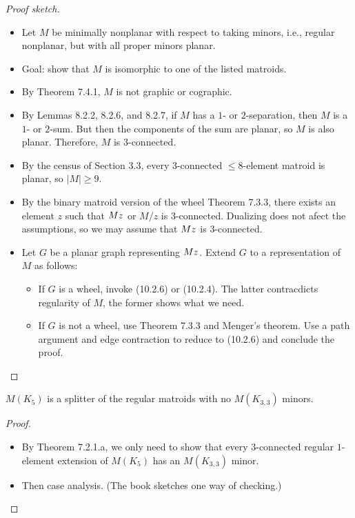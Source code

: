 \begin{proof}[Proof sketch]
  \begin{itemize}
    \item Let $M$ be minimally nonplanar with respect to taking minors, i.e., regular nonplanar, but with all proper minors planar.
    \item Goal: show that $M$ is isomorphic to one of the listed matroids.
    \item By Theorem 7.4.1, $M$ is not graphic or cographic.
    \item By Lemmas 8.2.2, 8.2.6, and 8.2.7, if $M$ has a $1$- or $2$-separation, then $M$ is a $1$- or $2$-sum. But then the components of the sum are planar, so $M$ is also planar. Therefore, $M$ is $3$-connected.
    \item By the census of Section 3.3, every $3$-connected $\leq 8$-element matroid is planar, so $|M| \geq 9$.
    \item By the binary matroid version of the wheel Theorem 7.3.3, there exists an element $z$ such that $M \\ z$ or $M / z$ is $3$-connected. Dualizing does not afect the assumptions, so we may assume that $M \\ z$ is $3$-connected.
    \item Let $G$ be a planar graph representing $M \\ z$. Extend $G$ to a representation of $M$ as follows:
    \begin{itemize}
      \item If $G$ is a wheel, invoke (10.2.6) or (10.2.4). The latter contracdicts regularity of $M$, the former shows what we need.
      \item If $G$ is not a wheel, use Theorem 7.3.3 and Menger's theorem. Use a path argument and edge contraction to reduce to (10.2.6) and conclude the proof.
    \end{itemize}
  \end{itemize}
\end{proof}

\begin{lemma}[10.3.1]
  \label{lem:10.3.1}
  $M(K_5)$ is a splitter of the regular matroids with no $M(K_{3,3})$ minors.
\end{lemma}

\begin{proof}
  \begin{itemize}
    \item By Theorem 7.2.1.a, we only need to show that every $3$-connected regular $1$-element extension of $M(K_5)$ has an $M(K_{3,3})$ minor.
    \item Then case analysis. (The book sketches one way of checking.)
  \end{itemize}
\end{proof}

